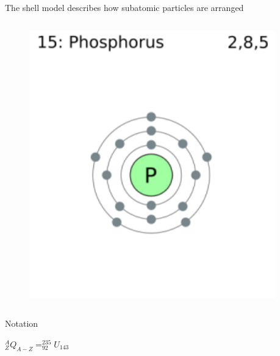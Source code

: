 \documentclass[aspectratio=1610,pdftex,dvipsnames,compress,xcolor={dvipsnames}]{beamer}
\begin{document}
\begin{frame}{The shell model describes how subatomic particles are arranged}
\begin{columns}
        \begin{column}{0.50\textwidth}
            \begin{figure}
                \centering
                \includegraphics[width=0.95\textwidth]{phosphorus.jpg}
            \end{figure}
        \end{column}

    \end{columns}
\end{frame}


\begin{frame}{Notation}

    \vspace*{\fill}
    
    \centering
    \LARGE
    $^{A}_{Z}Q_{A-Z} = ^{235}_{92}U_{143}$

    \vspace*{\fill}

\end{frame}
\end{document}
